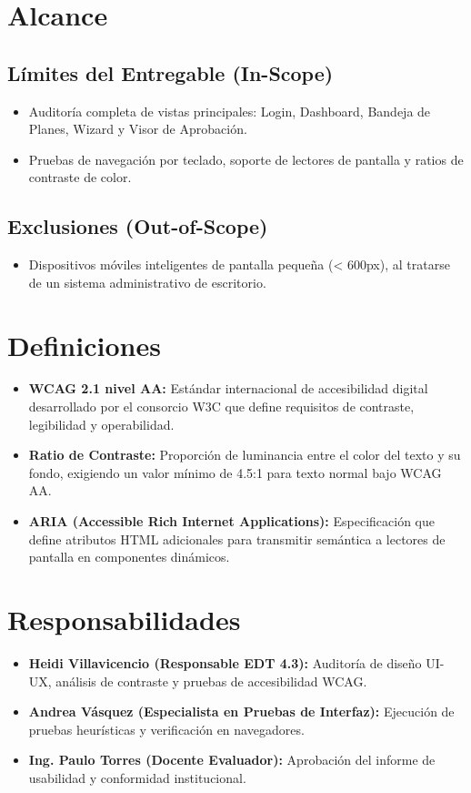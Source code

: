 \documentclass[12pt,a4paper]{article}
\begin{document}
\section{Alcance}
\subsection{Límites del Entregable (In-Scope)}
\begin{itemize}[leftmargin=1.5em, itemsep=2pt]
    \item Auditoría completa de vistas principales: Login, Dashboard, Bandeja de Planes, Wizard y Visor de Aprobación.
    \item Pruebas de navegación por teclado, soporte de lectores de pantalla y ratios de contraste de color.
\end{itemize}
\subsection{Exclusiones (Out-of-Scope)}
\begin{itemize}[leftmargin=1.5em, itemsep=2pt]
    \item Dispositivos móviles inteligentes de pantalla pequeña (< 600px), al tratarse de un sistema administrativo de escritorio.
\end{itemize}

\section{Definiciones}
\begin{itemize}[leftmargin=1.5em, itemsep=2pt]
    \item \textbf{WCAG 2.1 nivel AA:} Estándar internacional de accesibilidad digital desarrollado por el consorcio W3C que define requisitos de contraste, legibilidad y operabilidad.
    \item \textbf{Ratio de Contraste:} Proporción de luminancia entre el color del texto y su fondo, exigiendo un valor mínimo de 4.5:1 para texto normal bajo WCAG AA.
    \item \textbf{ARIA (Accessible Rich Internet Applications):} Especificación que define atributos HTML adicionales para transmitir semántica a lectores de pantalla en componentes dinámicos.
\end{itemize}

\section{Responsabilidades}
\begin{itemize}[leftmargin=1.5em, itemsep=2pt]
    \item \textbf{Heidi Villavicencio (Responsable EDT 4.3):} Auditoría de diseño UI-UX, análisis de contraste y pruebas de accesibilidad WCAG.
    \item \textbf{Andrea Vásquez (Especialista en Pruebas de Interfaz):} Ejecución de pruebas heurísticas y verificación en navegadores.
    \item \textbf{Ing. Paulo Torres (Docente Evaluador):} Aprobación del informe de usabilidad y conformidad institucional.
\end{itemize}
\end{document}
